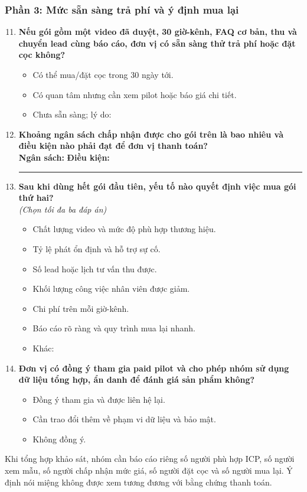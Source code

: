 \subsubsection*{Phần 3: Mức sẵn sàng trả phí và ý định mua lại}

\begin{enumerate}
    \setcounter{enumi}{10}
    \item \textbf{Nếu gói gồm một video đã duyệt, 30 giờ-kênh, FAQ cơ bản, thu
    và chuyển lead cùng báo cáo, đơn vị có sẵn sàng thử trả phí hoặc đặt cọc
    không?}
    \begin{itemize}
        \item[$\square$] Có thể mua/đặt cọc trong 30 ngày tới.
        \item[$\square$] Có quan tâm nhưng cần xem pilot hoặc báo giá chi tiết.
        \item[$\square$] Chưa sẵn sàng; lý do: \dotfill
    \end{itemize}

    \item \textbf{Khoảng ngân sách chấp nhận được cho gói trên là bao nhiêu và
    điều kiện nào phải đạt để đơn vị thanh toán?} \\
    \textbf{Ngân sách:} \dotfill \quad
    \textbf{Điều kiện:} \rule{0.43\linewidth}{0.4pt}

    \item \textbf{Sau khi dùng hết gói đầu tiên, yếu tố nào quyết định việc mua
    gói thứ hai?} \\
    \textit{(Chọn tối đa ba đáp án)}
    \begin{itemize}
        \item[$\square$] Chất lượng video và mức độ phù hợp thương hiệu.
        \item[$\square$] Tỷ lệ phát ổn định và hỗ trợ sự cố.
        \item[$\square$] Số lead hoặc lịch tư vấn thu được.
        \item[$\square$] Khối lượng công việc nhân viên được giảm.
        \item[$\square$] Chi phí trên mỗi giờ-kênh.
        \item[$\square$] Báo cáo rõ ràng và quy trình mua lại nhanh.
        \item[$\square$] Khác: \dotfill
    \end{itemize}

    \item \textbf{Đơn vị có đồng ý tham gia paid pilot và cho phép nhóm sử dụng
    dữ liệu tổng hợp, ẩn danh để đánh giá sản phẩm không?}
    \begin{itemize}
        \item[$\square$] Đồng ý tham gia và được liên hệ lại.
        \item[$\square$] Cần trao đổi thêm về phạm vi dữ liệu và bảo mật.
        \item[$\square$] Không đồng ý.
    \end{itemize}
\end{enumerate}

Khi tổng hợp khảo sát, nhóm cần báo cáo riêng số người phù hợp ICP, số người xem
mẫu, số người chấp nhận mức giá, số người đặt cọc và số người mua lại. Ý định nói
miệng không được xem tương đương với bằng chứng thanh toán.
